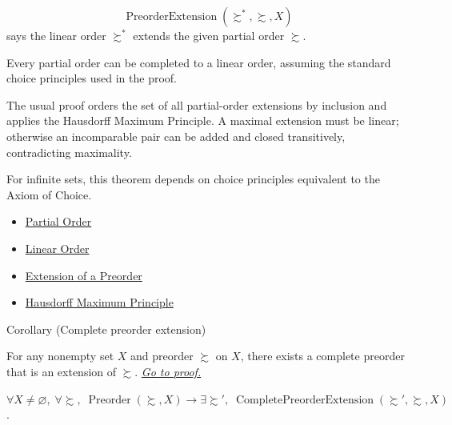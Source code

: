 \begin{remark*}
\[
  \operatorname{PreorderExtension}(\succsim^*,\succsim,X)
\] says the linear order
$\succsim^*$ extends the given partial order $\succsim$.
\end{remark*}

\begin{remark*}[Interpretation]
Every partial order can be completed to a linear order, assuming the standard
choice principles used in the proof.
\end{remark*}

\begin{remark*}[Exposition]
The usual proof orders the set of all partial-order extensions by inclusion
and applies the Hausdorff Maximum Principle. A maximal extension must be
linear; otherwise an incomparable pair can be added and closed transitively,
contradicting maximality.
\end{remark*}

\begin{remark*}[Exposition]
For infinite sets, this theorem depends on choice principles equivalent to the
Axiom of Choice.
\end{remark*}

\begin{dependencies}
\begin{itemize}
  \item \hyperref[def:partial-order]{Partial Order}
  \item \hyperref[def:total-order]{Linear Order}
  \item \hyperref[def:preorder-extension]{Extension of a Preorder}
  \item \hyperref[thm:hausdorff]{Hausdorff Maximum Principle}
\end{itemize}
\end{dependencies}

\begin{corollarybox}{Corollary (Complete preorder extension)}
\begin{corollary}\label{cor:complete-preorder-extension}
For any nonempty set $X$ and preorder $\succsim$ on $X$, there exists a
complete preorder that is an extension of $\succsim$.
\hyperref[prf:complete-preorder-extension]{\textit{Go to proof.}}
\end{corollary}
\end{corollarybox}

\begin{remark*}
$\forall X\neq\varnothing,\;\forall \succsim,\;
\operatorname{Preorder}(\succsim,X)\to
\exists \succsim',\; \operatorname{CompletePreorderExtension}(\succsim',\succsim,X)$.
\end{remark*}


